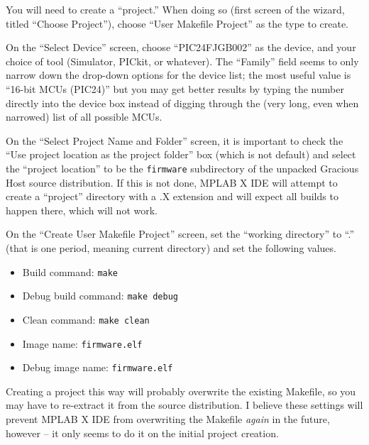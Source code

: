 You will need to create a ``project.''  When doing so (first screen of the
wizard, titled ``Choose Project''), choose ``User Makefile Project'' as the
type to create.

On the ``Select Device'' screen, choose ``PIC24FJGB002'' as the device,
and your choice of tool (Simulator, PICkit, or whatever).  The ``Family''
field seems to only narrow down the drop-down options for the device list;
the most useful value is ``16-bit MCUs (PIC24)'' but you may get better
results by typing the number directly into the device box instead of digging
through the (very long, even when narrowed) list of all possible MCUs.

On the ``Select Project Name and Folder'' screen, it is important to check
the ``Use project location as the project folder'' box (which is not
default) and select the ``project location'' to be the \texttt{firmware}
subdirectory of the unpacked Gracious Host source distribution.  If this is
not done, MPLAB X IDE will attempt to create a ``project'' directory with a
.X extension and will expect all builds to happen there, which will not work.

On the ``Create User Makefile Project'' screen, set the ``working
directory'' to ``.'' (that is one period, meaning current directory) and set
the following values.
\begin{itemize}
  \item Build command:  \texttt{make}
  \item Debug build command:  \texttt{make debug}
  \item Clean command:  \texttt{make clean}
  \item Image name:  \texttt{firmware.elf}
  \item Debug image name:  \texttt{firmware.elf}
\end{itemize}

Creating a project this way will probably overwrite the existing Makefile,
so you may have to re-extract it from the source distribution.  I believe
these settings will prevent MPLAB X IDE from overwriting the Makefile
\emph{again} in the future, however -- it only seems to do it on the initial
project creation.

